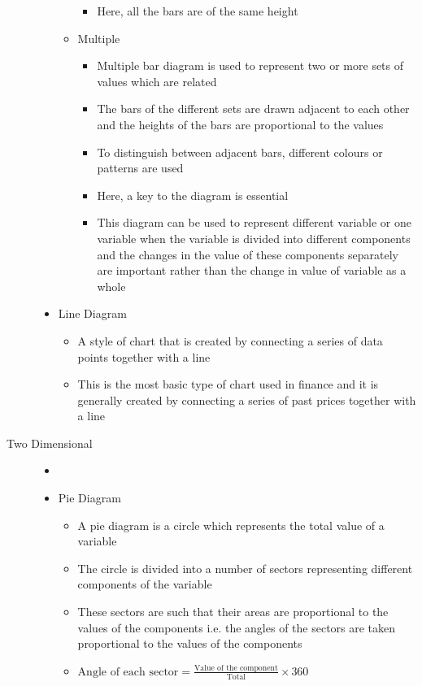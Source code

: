 \documentclass[
10pt, %
a4paper, %
]{report}
\begin{document}
\begin{description}
\begin{itemize}
\begin{itemize}
\begin{itemize}
\item Here, all the bars are of the same height
\end{itemize}
\item Multiple
\begin{itemize}
\item Multiple bar diagram is used to represent two or more sets of values which are related
\item The bars of the different sets are drawn adjacent to each other and the heights of the bars are proportional to the values
\item To distinguish between adjacent bars, different colours or patterns are used
\item Here, a key to the diagram is essential
\item This diagram can be used to represent different variable or one variable when the variable is divided into different components and the changes in the value of these components separately are important rather than the change in value of variable as a whole
\end{itemize}
\end{itemize}
\item Line Diagram
\begin{itemize}
\item A style of chart that is created by connecting a series of data points together with a line
\item This is the most basic type of chart used in finance and it is generally created by  connecting a series of past prices together with a line
\end{itemize}
\end{itemize}
\item[Two Dimensional]
\begin{itemize}
\item[]
\item Pie Diagram
\begin{itemize}
\item A pie diagram is a circle which represents the total value of a variable
\item The circle is divided into a number of sectors representing different components of the variable
\item These sectors are such that their areas are proportional to the values of the components i.e. the angles of the sectors are taken proportional to the values of the components
\item \(\text{Angle of each sector} = \frac{\text{Value of the component}}{\text{Total}} \times 360\)

\end{itemize}
\end{itemize}
\end{description}
\end{document}
